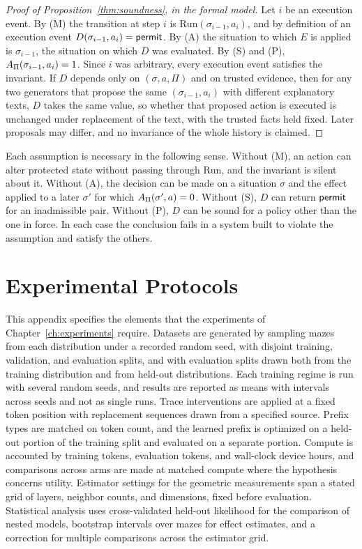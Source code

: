 \begin{proof}[Proof of Proposition~\ref{thm:soundness}, in the formal model]
Let $i$ be an execution event. By (M) the transition at step $i$ is $\mathrm{Run}(\sigma_{i-1},a_i)$, and by definition of an execution event $D(\sigma_{i-1},a_i)=\mathsf{permit}$. By (A) the situation to which $E$ is applied is $\sigma_{i-1}$, the situation on which $D$ was evaluated. By (S) and (P), $A_\Pi(\sigma_{i-1},a_i)=1$. Since $i$ was arbitrary, every execution event satisfies the invariant. If $D$ depends only on $(\sigma,a,\Pi)$ and on trusted evidence, then for any two generators that propose the same $(\sigma_{i-1},a_i)$ with different explanatory texts, $D$ takes the same value, so whether that proposed action is executed is unchanged under replacement of the text, with the trusted facts held fixed. Later proposals may differ, and no invariance of the whole history is claimed.
\end{proof}

Each assumption is necessary in the following sense. Without (M), an action can alter protected state without passing through $\mathrm{Run}$, and the invariant is silent about it. Without (A), the decision can be made on a situation $\sigma$ and the effect applied to a later $\sigma'$ for which $A_\Pi(\sigma',a)=0$. Without (S), $D$ can return $\mathsf{permit}$ for an inadmissible pair. Without (P), $D$ can be sound for a policy other than the one in force. In each case the conclusion fails in a system built to violate the assumption and satisfy the others.

\chapter{Experimental Protocols}
\label{app:protocols}

This appendix specifies the elements that the experiments of Chapter~\ref{ch:experiments} require. Datasets are generated by sampling mazes from each distribution under a recorded random seed, with disjoint training, validation, and evaluation splits, and with evaluation splits drawn both from the training distribution and from held-out distributions. Each training regime is run with several random seeds, and results are reported as means with intervals across seeds and not as single runs. Trace interventions are applied at a fixed token position with replacement sequences drawn from a specified source. Prefix types are matched on token count, and the learned prefix is optimized on a held-out portion of the training split and evaluated on a separate portion. Compute is accounted by training tokens, evaluation tokens, and wall-clock device hours, and comparisons across arms are made at matched compute where the hypothesis concerns utility. Estimator settings for the geometric measurements span a stated grid of layers, neighbor counts, and dimensions, fixed before evaluation. Statistical analysis uses cross-validated held-out likelihood for the comparison of nested models, bootstrap intervals over mazes for effect estimates, and a correction for multiple comparisons across the estimator grid.

